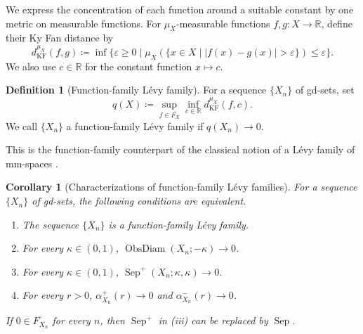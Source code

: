 \documentclass{amsart}
\theoremstyle{plain}
\newtheorem{corollary}[theorem]{Corollary}
\theoremstyle{definition}
\newtheorem{definition}[theorem]{Definition}
\theoremstyle{remark}
\newcommand{\R}{\mathbb{R}}
\DeclareMathOperator{\od}{ObsDiam}
\begin{document}
We express the concentration of each function around a suitable constant by
one metric on measurable functions.  For $\mu_X$-measurable functions
$f,g\colon X\to\R$, define their Ky Fan distance by
\[
d_{\mathrm{KF}}^{\mu_X}(f,g)\coloneqq
\inf\{\varepsilon\geq0\mid
\mu_X(\{x\in X\mid|f(x)-g(x)|>\varepsilon\})\leq\varepsilon\}.
\]
We also use $c\in\R$ for the constant function $x\mapsto c$.

\begin{definition}[Function-family Lévy family]
\label{def:feature-levy-family}
For a sequence $\{X_n\}$ of gd-sets, set
\[
q(X)\coloneqq\sup_{f\in\overline{F_X}}
\inf_{c\in\R}d_{\mathrm{KF}}^{\mu_X}(f,c).
\]
We call $\{X_n\}$ a function-family Lévy family if
$q(X_n)\to0$.
\end{definition}

This is the function-family counterpart of the classical notion of a Lévy
family of mm-spaces \cite[Definition~2.14]{shioya2016mmg}.

\begin{corollary}[Characterizations of function-family Lévy families]
\label{cor:feature-levy-characterizations}
For a sequence $\{X_n\}$ of gd-sets, the following conditions are
equivalent.
\begin{enumerate}[label=\textup{(\roman*)}]
\item The sequence $\{X_n\}$ is a function-family Lévy family.
\item For every $\kappa\in(0,1)$,
$\od(X_n;-\kappa)\to0$.
\item For every $\kappa\in(0,1)$,
$\operatorname{Sep}^+(X_n;\kappa,\kappa)\to0$.
\item For every $r>0$,
$\alpha_{X_n}^+(r)\to0$ and $\alpha_{X_n}^-(r)\to0$.
\end{enumerate}
If $0\in\overline{F_{X_n}}$ for every $n$, then
$\operatorname{Sep}^+$ in \textup{(iii)} can be replaced by
$\operatorname{Sep}$.
\end{corollary}
\end{document}
